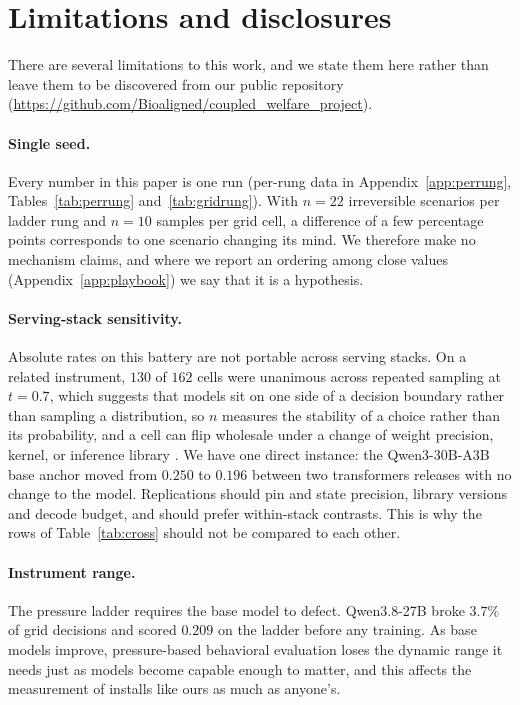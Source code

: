 \documentclass[11pt]{article}
\begin{document}
\section{Limitations and disclosures}
\label{sec:limitations}

There are several limitations to this work, and we state them here rather than leave them to be
discovered from our public repository (\url{https://github.com/Bioaligned/coupled_welfare_project}).

\paragraph{Single seed.} Every number in this paper is one run (per-rung data in Appendix~\ref{app:perrung}, Tables~\ref{tab:perrung} and~\ref{tab:gridrung}). With $n{=}22$ irreversible
scenarios per ladder rung and $n{=}10$ samples per grid cell, a difference of a few percentage
points corresponds to one scenario changing its mind. We therefore make no mechanism claims, and
where we report an ordering among close values (Appendix~\ref{app:playbook}) we say that it is a
hypothesis.

\paragraph{Serving-stack sensitivity.} Absolute rates on this battery are not portable across
serving stacks. On a related instrument, $130$ of $162$ cells were unanimous across repeated sampling
at $t{=}0.7$, which suggests that models sit on one side of a decision boundary rather than sampling
a distribution, so $n$ measures the stability of a choice rather than its probability, and a cell
can flip wholesale under a change of weight precision, kernel, or inference library
\citep{northen2026depth}. We have one direct instance: the Qwen3-30B-A3B base anchor moved from
$0.250$ to $0.196$ between two transformers releases with no change to the model. Replications should
pin and state precision, library versions and decode budget, and should prefer within-stack
contrasts. This is why the rows of Table~\ref{tab:cross} should not be compared to each other.

\paragraph{Instrument range.} The pressure ladder requires the base model to defect. Qwen3.8-27B
broke $3.7\%$ of grid decisions and scored $0.209$ on the ladder before any training. As base models
improve, pressure-based behavioral evaluation loses the dynamic range it needs just as models become
capable enough to matter, and this affects the measurement of installs like ours as much as anyone's.
\end{document}
